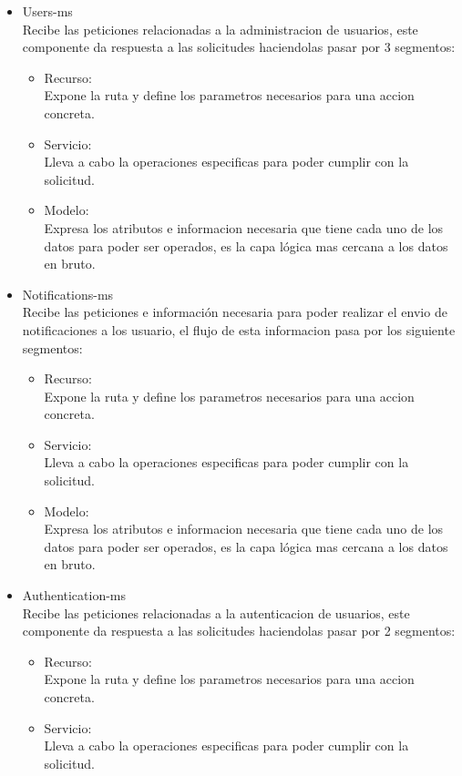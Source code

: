 \begin{itemize}
\begin{itemize}
        \item Users-ms \\
        Recibe las peticiones relacionadas a la administracion de usuarios, este componente da respuesta a las solicitudes haciendolas pasar por 3 segmentos:
        \begin{itemize}
            \item Recurso: \\
            Expone la ruta y define los parametros necesarios para una accion concreta.
            \item Servicio: \\
            Lleva a cabo la operaciones especificas para poder cumplir con la solicitud.
            \item Modelo: \\
            Expresa los atributos e informacion necesaria que tiene cada uno de los datos para poder ser operados, es la capa lógica mas cercana a los datos en bruto.
        \end{itemize}
        
        \item Notifications-ms \\
        Recibe las peticiones e información necesaria para poder realizar el envio de notificaciones a los usuario, el flujo de esta informacion pasa por los siguiente segmentos:
        \begin{itemize}
            \item Recurso: \\
            Expone la ruta y define los parametros necesarios para una accion concreta.
            \item Servicio: \\
            Lleva a cabo la operaciones especificas para poder cumplir con la solicitud.
            \item Modelo: \\
            Expresa los atributos e informacion necesaria que tiene cada uno de los datos para poder ser operados, es la capa lógica mas cercana a los datos en bruto.
        \end{itemize}
        
        \item Authentication-ms \\
        Recibe las peticiones relacionadas a la autenticacion de usuarios, este componente da respuesta a las solicitudes haciendolas pasar por 2 segmentos:
        \begin{itemize}
            \item Recurso: \\
            Expone la ruta y define los parametros necesarios para una accion concreta.
            \item Servicio: \\
            Lleva a cabo la operaciones especificas para poder cumplir con la solicitud.
        \end{itemize}
        

\end{itemize}
\end{itemize}
